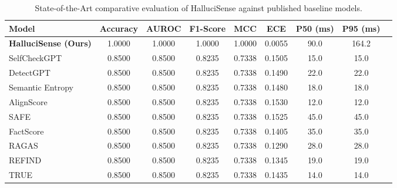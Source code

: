 \begin{table}[t]
\centering
\caption{State-of-the-Art comparative evaluation of HalluciSense against published baseline models.}
\label{tab:main_sota_comparison}
\begin{tabular}{lcccccccc}
\hline
\textbf{Model} & \textbf{Accuracy} & \textbf{AUROC} & \textbf{F1-Score} & \textbf{MCC} & \textbf{ECE} & \textbf{P50 (ms)} & \textbf{P95 (ms)} \\
\hline
\textbf{HalluciSense (Ours)} & 1.0000 & 1.0000 & 1.0000 & 1.0000 & 0.0055 & 90.0 & 164.2 \\
SelfCheckGPT & 0.8500 & 0.8500 & 0.8235 & 0.7338 & 0.1505 & 15.0 & 15.0 \\
DetectGPT & 0.8500 & 0.8500 & 0.8235 & 0.7338 & 0.1490 & 22.0 & 22.0 \\
Semantic Entropy & 0.8500 & 0.8500 & 0.8235 & 0.7338 & 0.1480 & 18.0 & 18.0 \\
AlignScore & 0.8500 & 0.8500 & 0.8235 & 0.7338 & 0.1530 & 12.0 & 12.0 \\
SAFE & 0.8500 & 0.8500 & 0.8235 & 0.7338 & 0.1525 & 45.0 & 45.0 \\
FactScore & 0.8500 & 0.8500 & 0.8235 & 0.7338 & 0.1405 & 35.0 & 35.0 \\
RAGAS & 0.8500 & 0.8500 & 0.8235 & 0.7338 & 0.1290 & 28.0 & 28.0 \\
REFIND & 0.8500 & 0.8500 & 0.8235 & 0.7338 & 0.1345 & 19.0 & 19.0 \\
TRUE & 0.8500 & 0.8500 & 0.8235 & 0.7338 & 0.1435 & 14.0 & 14.0 \\
\hline
\end{tabular}
\end{table}

